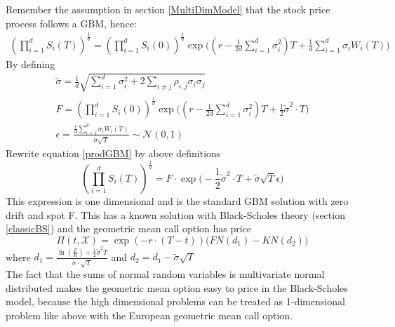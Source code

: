 Remember the assumption in section \ref{MultiDimModel} that the stock price process follows a GBM, hence:
\begin{equation}\label{prodGBM}
\begin{split}
(\prod_{i=1}^{d} S_i(T))^{\frac{1}{d}} = (\prod_{i=1}^{d} S_i(0))^{\frac{1}{d}} \exp\bigg((r-\frac{1}{2d}\sum_{i=1}^{d}\sigma_i^2)T + \frac{1}{d} \sum_{i=1}^{d} \sigma_i W_i(T) \bigg)
\end{split}
\end{equation}
By defining
\begin{align}
\tilde{\sigma} = \frac{1}{d} \sqrt{\sum_{i=1}^{d} \sigma_i^2 + 2 \sum_{i\neq j} \rho_{i,j} \sigma_i \sigma_j}\\
F=(\prod_{i=1}^{d} S_i(0))^{\frac{1}{d}} \exp\bigg((r-\frac{1}{2d}\sum_{i=1}^{d}\sigma_i^2)T + \frac{1}{2} \tilde{\sigma}^2 \cdot T \bigg)\\
\epsilon = \frac{\frac{1}{d} \sum_{i=1}^{d} \sigma_i W_i(T)}{\tilde{\sigma} \sqrt{T}} \sim \mathcal{N}(0,1)
\end{align}
Rewrite equation \eqref{prodGBM} by above definitions
$$(\prod_{i=1}^{d} S_i(T))^{\frac{1}{d}} = F \cdot \exp\bigg( -\frac{1}{2} \tilde{\sigma}^2 \cdot T + \tilde{\sigma} \sqrt{T} \epsilon \bigg)$$
This expression is one dimensional and is the standard GBM solution with zero drift and spot F. This has a known solution with Black-Scholes theory (section \ref{classicBS}) and the geometric mean call option has price
\begin{equation*}
\Pi(t,\mathcal{X})=\exp(-r \cdot (T-t))\bigg(F N(d_1) - K N(d_2) \bigg)
\end{equation*}
where $d_1=\frac{\ln(\frac{F}{K}) + \frac{1}{2} \tilde{\sigma}^2 T}{\tilde{\sigma} \cdot \sqrt{T}}$ and $d_2=d_1-\tilde{\sigma} \sqrt{T}$\\

The fact that the sums of normal random variables is multivariate normal distributed makes the geometric mean option easy to price in the Black-Scholes model, because the high dimensional problems can be treated as 1-dimensional problem like above with the European geometric mean call option.

